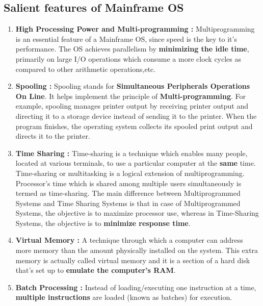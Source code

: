 \documentclass{article}
\begin{document}
      \subsection{Salient features of Mainframe OS}
      \begin{enumerate}
         \item \textbf{High Processing Power and Multi-programming :} Multiprogramming is an essential feature of a Mainframe OS, since speed is the key to it's performance. The OS achieves parallelism by \textbf{minimizing the idle time}, primarily on large I/O operations which consume a more clock cycles as compared to other arithmetic operations,etc.  
      \item \textbf{Spooling :} Spooling stands for \textbf{Simultaneous Peripherals Operations On Line}. It helps implement the principle of \textbf{Multi-programming}. For example, spooling manages printer output by receiving printer output and directing it to a storage device instead of sending it to the printer. When the program finishes, the operating system collects its spooled print output and directs it to the printer.
      \item \textbf{Time Sharing :} Time-sharing is a technique which enables many people, located at various terminals, to use a particular computer at the \textbf{same} time. Time-sharing or multitasking is a logical extension of multiprogramming. Processor's time which is shared among multiple users simultaneously is termed as time-sharing. The main difference between Multiprogrammed Systems and Time Sharing Systems is that in case of Multiprogrammed Systems, the objective is to maximize processor use, whereas in Time-Sharing Systems, the objective is to \textbf{minimize response time}.
      \item \textbf{Virtual Memory :} A technique through which a computer can address more memory than the amount physically installed on the system. This extra memory is actually called virtual memory and it is a section of a hard disk that's set up to \textbf{emulate the computer's RAM}.
      \item \textbf{Batch Processing :} Instead of loading/executing one
      instruction at a time, \textbf{multiple instructions} are loaded (known as batches) for execution.
       \end{enumerate}
\end{document}
